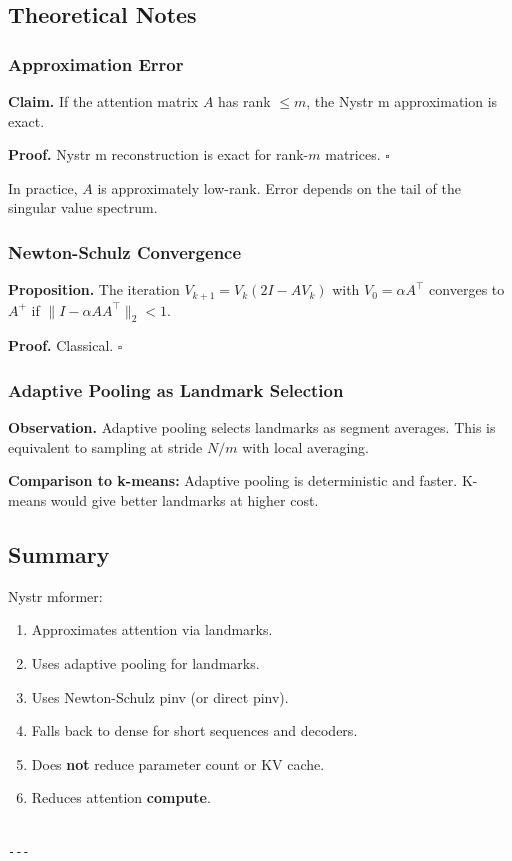 \subsection{Theoretical Notes}

\subsubsection{Approximation Error}

\textbf{Claim.} If the attention matrix $A$ has rank $\leq m$, the Nystr m 
approximation is exact.

\textbf{Proof.} Nystr m reconstruction is exact for rank-$m$ matrices. $\square$

In practice, $A$ is approximately low-rank. Error depends on the tail of 
the singular value spectrum.

\subsubsection{Newton-Schulz Convergence}

\textbf{Proposition.} The iteration $V_{k+1} = V_k (2I - A V_k)$ with 
$V_0 = \alpha A^\top$ converges to $A^+$ if $\|I - \alpha A A^\top\|_2 < 1$.

\textbf{Proof.} Classical. $\square$

\subsubsection{Adaptive Pooling as Landmark Selection}

\textbf{Observation.} Adaptive pooling selects landmarks as segment averages. 
This is equivalent to sampling at stride $N / m$ with local averaging.

\textbf{Comparison to k-means:} Adaptive pooling is deterministic and faster. 
K-means would give better landmarks at higher cost.

\subsection{Summary}

Nystr mformer:
\begin{enumerate}
\item Approximates attention via landmarks.
\item Uses adaptive pooling for landmarks.
\item Uses Newton-Schulz pinv (or direct pinv).
\item Falls back to dense for short sequences and decoders.
\item Does \textbf{not} reduce parameter count or KV cache.
\item Reduces attention \textbf{compute}.
\end{enumerate}
\begin{lstlisting}

---
\end{lstlisting}